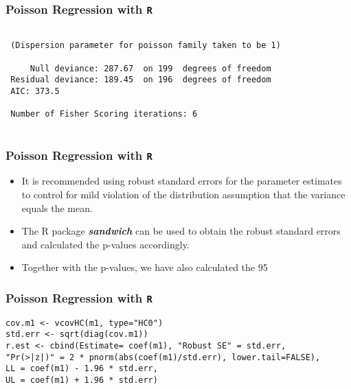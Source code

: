 \documentclass[00-GLMregslides.tex]{subfiles}
\begin{document}
\begin{frame}[fragile]

\frametitle{Poisson Regression with \texttt{R}}
\large
\begin{framed}
\begin{verbatim}

 (Dispersion parameter for poisson family taken to be 1)
 
     Null deviance: 287.67  on 199  degrees of freedom
 Residual deviance: 189.45  on 196  degrees of freedom
 AIC: 373.5
 
 Number of Fisher Scoring iterations: 6
 
 \end{verbatim}
\end{framed}
\end{frame}

\begin{frame}[fragile]

\frametitle{Poisson Regression with \texttt{R}}
\Large 
\begin{itemize}
\item It is recommended using robust standard errors for the parameter estimates to control for mild violation of the distribution assumption that the variance equals the mean. 
\item The  R package \textbf{\textit{sandwich}} can be used to obtain the robust standard errors and calculated the p-values accordingly. 
\item Together with the p-values, we have also calculated the 95%
\end{itemize}
\end{frame}

\begin{frame}[fragile]

\frametitle{Poisson Regression with \texttt{R}}
\large
\begin{framed}
\begin{verbatim}
cov.m1 <- vcovHC(m1, type="HC0")
std.err <- sqrt(diag(cov.m1))
r.est <- cbind(Estimate= coef(m1), "Robust SE" = std.err,
"Pr(>|z|)" = 2 * pnorm(abs(coef(m1)/std.err), lower.tail=FALSE),
LL = coef(m1) - 1.96 * std.err,
UL = coef(m1) + 1.96 * std.err)

\end{verbatim}
\end{framed}
\end{frame}
\end{document}
